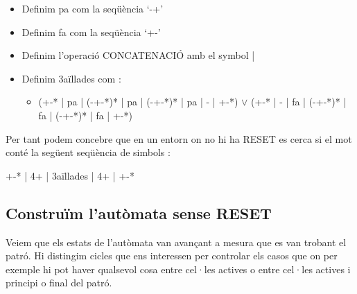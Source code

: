\documentclass[12pt,a4paper]{report}
\begin{document}
\begin{itemize}
\item Definim pa com la seqüència ‘-+’
\item Definim fa com la seqüència ‘+-’
\item Definim l’operació CONCATENACIÓ amb el symbol | 
\item Definim 3aïllades com :
\begin{itemize}
\item ({+-}* | pa | (-{+-}*)* | pa | (-{+-}*)* | pa | - | {+-}*) $\vee$ ({+-}* | - | fa | (-{+-}*)* | fa | (-{+-}*)* | fa | {+-}*)
\end{itemize}
\end{itemize}

Per tant podem concebre que en un entorn on no hi ha RESET es cerca si el mot conté la següent seqüència de simbols : 

\begin{center}
{+-}* | 4+ | 3aïllades | 4+ | {+-}*
\end{center}

\subsection{Construïm l’autòmata sense RESET}

Veiem que els estats de l'autòmata van avançant a mesura que es van trobant el patró. Hi distingim cicles que ens interessen per controlar els casos que on per exemple hi pot haver qualsevol cosa entre cel·les actives o entre cel·les actives i principi o final del patró. 
\end{document}
